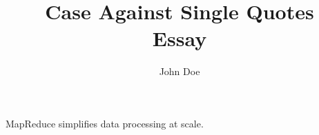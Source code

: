 \documentclass{article}
\title{Case Against Single Quotes\\\small{Essay}}
\author{John Doe}
\begin{document}
\maketitle

MapReduce \cite{dean2004mapreduce} simplifies data processing at scale.



\end{document}
